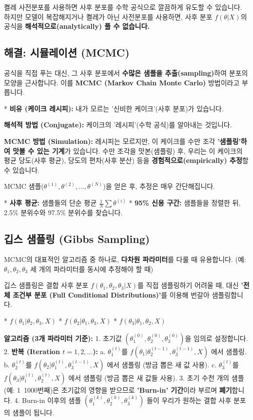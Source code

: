 \documentclass[11pt,a4paper]{book}
\theoremstyle{definition}
\begin{document}
켤레 사전분포를 사용하면 사후 분포를 수학 공식으로 깔끔하게 유도할 수 있습니다.
하지만 모델이 복잡해지거나 켤레가 아닌 사전분포를 사용하면,
사후 분포 $f(\theta | X)$의 공식을 \textbf{해석적으로(analytically) 풀 수 없습니다.}

\subsection{해결: 시뮬레이션 (MCMC)}

공식을 직접 푸는 대신, 그 사후 분포에서 \textbf{수많은 샘플을 추출(sampling)}하여 분포의 모양을 근사합니다.
이를 \textbf{MCMC (Markov Chain Monte Carlo)} 방법이라고 부릅니다.

* \textbf{비유 (케이크 레시피):}
    내가 모르는 '신비한 케이크'(사후 분포)가 있습니다.
    
    \textbf{해석적 방법 (Conjugate):} 케이크의 '레시피'(수학 공식)를 알아내는 것입니다.
    
    \textbf{MCMC 방법 (Simulation):} 레시피는 모르지만, 이 케이크를 수만 조각 \textbf{'샘플링'하여 맛볼 수 있는 기계}가 있습니다.
    수만 조각을 맛본(샘플링) 후, 우리는 이 케이크의 평균 당도(사후 평균), 당도의 편차(사후 분산) 등을 \textbf{경험적으로(empirically) 추정}할 수 있습니다.

MCMC 샘플($\theta^{(1)}, \theta^{(2)}, ..., \theta^{(N)}$)을 얻은 후, 추정은 매우 간단해집니다.

* \textbf{사후 평균:} 샘플들의 단순 평균 $\frac{1}{N}\sum \theta^{(i)}$
* \textbf{95\% 신용 구간:} 샘플들을 정렬한 뒤, 2.5\% 분위수와 97.5\% 분위수를 찾습니다.

\subsection{깁스 샘플링 (Gibbs Sampling)}

MCMC의 대표적인 알고리즘 중 하나로, \textbf{다차원 파라미터}를 다룰 때 유용합니다.
(예: $\theta_1, \theta_2, \theta_3$ 세 개의 파라미터를 동시에 추정해야 할 때)

깁스 샘플링은 결합 사후 분포 $f(\theta_1, \theta_2, \theta_3 | X)$를 직접 샘플링하기 어려울 때,
대신 \textbf{'전체 조건부 분포 (Full Conditional Distributions)'}를 이용해 번갈아 샘플링합니다.

* $f(\theta_1 | \theta_2, \theta_3, X)$
* $f(\theta_2 | \theta_1, \theta_3, X)$
* $f(\theta_3 | \theta_1, \theta_2, X)$

\textbf{알고리즘 (3개 파라미터 기준):}
1.  초기값 $(\theta_1^{(0)}, \theta_2^{(0)}, \theta_3^{(0)})$을 임의로 설정합니다.
2.  \textbf{반복 (Iteration $t=1, 2, ...$):}
    a. $\theta_1^{(t)}$를 $f(\theta_1 | \theta_2^{(t-1)}, \theta_3^{(t-1)}, X)$ 에서 샘플링.
    b. $\theta_2^{(t)}$를 $f(\theta_2 | \textbf{$\theta_1^{(t)}$}, \theta_3^{(t-1)}, X)$ 에서 샘플링 (방금 뽑은 새 값 사용).
    c. $\theta_3^{(t)}$를 $f(\theta_3 | \textbf{$\theta_1^{(t)}$}, \textbf{$\theta_2^{(t)}$}, X)$ 에서 샘플링 (방금 뽑은 새 값들 사용).
3.  초기 수천 개의 샘플(예: 1~1000번째)은 초기값의 영향을 받으므로 \textbf{'Burn-in' 기간}이라 부르며 \textbf{폐기}합니다.
4.  Burn-in 이후의 샘플 $(\theta_1^{(k)}, \theta_2^{(k)}, \theta_3^{(k)})$ 들이 우리가 원하는 결합 사후 분포의 샘플이 됩니다.
\end{document}
